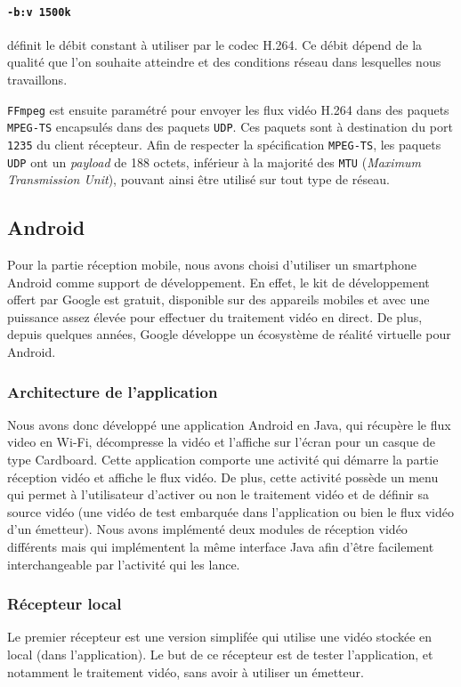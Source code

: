 \documentclass[11pt,a4paper]{article}
\begin{document}
\paragraph{\texttt{-b:v 1500k}} définit le débit constant à utiliser par le codec H.264.
Ce débit dépend de la qualité que l'on souhaite atteindre et des conditions réseau dans lesquelles nous travaillons.

\bigbreak
\texttt{FFmpeg} est ensuite paramétré pour envoyer les flux vidéo H.264 dans des paquets \texttt{MPEG-TS} encapsulés dans des paquets \texttt{UDP}.
Ces paquets sont à destination du port \texttt{1235} du client récepteur.
Afin de respecter la spécification \texttt{MPEG-TS}, les paquets \texttt{UDP} ont un \textit{payload} de 188 octets, inférieur à la majorité des \texttt{MTU} (\textit{Maximum Transmission Unit}), pouvant ainsi être utilisé sur tout type de réseau.

\subsection{Android}
Pour la partie réception mobile, nous avons choisi d'utiliser un smartphone Android comme support de développement.
En effet, le kit de développement offert par Google est gratuit, disponible sur des appareils mobiles et avec une puissance assez élevée pour effectuer du traitement vidéo en direct.
De plus, depuis quelques années, Google développe un écosystème de réalité virtuelle pour Android.

\subsubsection{Architecture de l'application}
Nous avons donc développé une application Android en Java, qui récupère le flux video en Wi-Fi, décompresse la vidéo et l'affiche sur l'écran pour un casque de type Cardboard.
Cette application comporte une activité qui démarre la partie réception vidéo et affiche le flux vidéo. De plus, cette activité possède un menu qui permet à l'utilisateur d'activer ou non le traitement vidéo et de définir sa source vidéo (une vidéo de test embarquée dans l'application ou bien le flux vidéo d'un émetteur).
Nous avons implémenté deux modules de réception vidéo différents mais qui implémentent la même interface Java afin d'être facilement interchangeable par l'activité qui les lance.

\subsubsection{Récepteur local}
Le premier récepteur est une version simplifée qui utilise une vidéo stockée en local (dans l'application).
Le but de ce récepteur est de tester l'application, et notamment le traitement vidéo, sans avoir à utiliser un émetteur.
\end{document}
